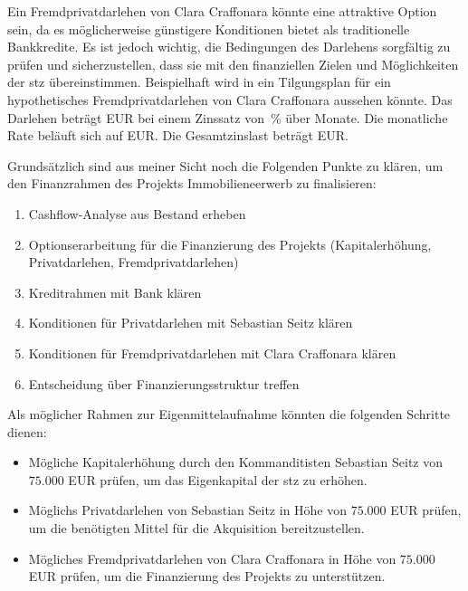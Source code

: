 \par Ein Fremdprivatdarlehen von Clara Craffonara könnte eine attraktive Option sein, da es möglicherweise günstigere Konditionen bietet als traditionelle Bankkredite. Es ist jedoch wichtig, die Bedingungen des Darlehens sorgfältig zu prüfen und sicherzustellen, dass sie mit den finanziellen Zielen und Möglichkeiten der \gls{stz} übereinstimmen. Beispielhaft wird in  ein Tilgungsplan für ein hypothetisches Fremdprivatdarlehen von Clara Craffonara aussehen könnte. Das Darlehen beträgt \CCBDarlehen{} EUR bei einem Zinssatz von \CCBZinssatz{}\,\% über \CCBLaufzeit{} Monate. Die monatliche Rate beläuft sich auf \CCBAnnuitaet{} EUR.
Die Gesamtzinslast beträgt \CCBGesamtzinsen{} EUR.


\newpage

\par Grundsätzlich sind aus meiner Sicht noch die Folgenden Punkte zu klären, um den Finanzrahmen des Projekts \glqq Immobilieneerwerb \grqq  zu finalisieren:

\begin{enumerate}
    \item Cashflow-Analyse aus Bestand erheben
    \item Optionserarbeitung für die Finanzierung des Projekts (Kapitalerhöhung, Privatdarlehen, Fremdprivatdarlehen)
    \item Kreditrahmen mit Bank klären 
    \item Konditionen für Privatdarlehen mit Sebastian Seitz klären
    \item Konditionen für Fremdprivatdarlehen mit Clara Craffonara klären
    \item Entscheidung über Finanzierungsstruktur treffen
\end{enumerate}


\par Als möglicher Rahmen zur Eigenmittelaufnahme könnten die folgenden Schritte dienen:

\begin{itemize}
    \item Mögliche Kapitalerhöhung durch den Kommanditisten Sebastian Seitz von $75.000$ EUR prüfen, um das Eigenkapital der \gls{stz} zu erhöhen.
    \item Möglichs Privatdarlehen von Sebastian Seitz in Höhe von $75.000$ EUR prüfen, um die benötigten Mittel für die Akquisition bereitzustellen.
    \item Mögliches Fremdprivatdarlehen von Clara Craffonara in Höhe von $75.000$ EUR prüfen, um die Finanzierung des Projekts zu unterstützen.
\end{itemize}
